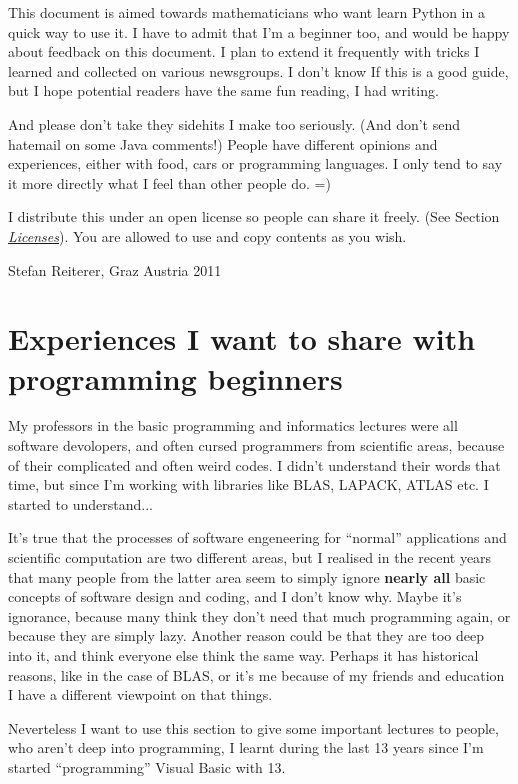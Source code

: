 \documentclass[letterpaper,10pt,english]{manual}
\begin{document}
This document is aimed towards mathematicians who want learn Python in a quick way to use it.
I have to admit that I'm a beginner too, and would be happy about
feedback on this document. I plan to extend it frequently with tricks
I learned and collected on various newsgroups. I don't know If this is
a good guide, but I hope potential readers have the same fun reading,
I had writing.

And please don't take they sidehits I make too seriously.  (And don't send hatemail on some Java comments!)
People have different opinions and experiences, either with food, cars or programming languages. I only tend to say it more
directly what I feel than other people do. =)

I distribute this under an open license so people can share it
freely. (See Section \hyperlink{license-ref}{\emph{Licenses}}). You are allowed to use and
copy contents as you wish.

Stefan Reiterer,
Graz Austria
2011


\section{Experiences I want to share with programming beginners}

My professors in the basic programming and informatics lectures were all software devolopers, and often cursed programmers from scientific areas,
because of their complicated and often weird codes. I didn't understand their words that time, but since I'm working with libraries like
BLAS, LAPACK, ATLAS etc. I started to understand...

It's true that the processes of software engeneering for ``normal'' applications and scientific computation are two different areas, but I realised in the recent
years that many people from the latter area seem to simply ignore \textbf{nearly all} basic concepts of software design and coding, and I don't know why.
Maybe it's ignorance, because many think they don't need that much programming again, or because they are simply lazy. Another reason could be
that they are too deep into it, and think everyone else think the same way. Perhaps it has historical reasons, like in the case of BLAS,
or it's me because of my friends and education I have a different viewpoint on  that things.

Neverteless I want to use this section to give some important lectures to people, who aren't deep into programming,
I learnt during the last 13 years since I'm started ``programming'' Visual Basic with 13.
\end{document}
